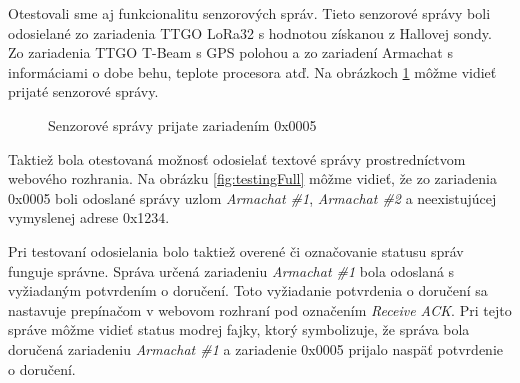 \documentclass[slovak,master]{diploma}
\begin{document}
Otestovali sme aj funkcionalitu senzorových správ. Tieto senzorové správy boli odosielané zo zariadenia TTGO LoRa32 s hodnotou získanou z Hallovej sondy. 
Zo zariadenia TTGO T-Beam s GPS polohou a zo zariadení Armachat s informáciami o dobe behu, teplote procesora atď. 
Na obrázkoch \ref{fig:testingSensors} môžme vidieť prijaté senzorové správy.
\begin{figure}[h!]
  \centering
  \caption{Senzorové správy prijate zariadením 0x0005}
  \label{fig:testingSensors}
\end{figure}

Taktiež bola otestovaná možnosť odosielať textové správy prostredníctvom webového rozhrania. Na obrázku \ref{fig:testingFull} môžme vidieť, 
že zo zariadenia 0x0005 boli odoslané správy uzlom \emph{Armachat \#1}, \emph{Armachat \#2} a neexistujúcej vymyslenej adrese 0x1234. 

Pri testovaní odosielania bolo taktiež overené či označovanie statusu správ funguje správne. Správa určená zariadeniu \emph{Armachat \#1} bola 
odoslaná s vyžiadaným potvrdením o doručení. Toto vyžiadanie potvrdenia o doručení sa nastavuje prepínačom v webovom rozhraní pod označením \emph{Receive ACK}.
Pri tejto správe môžme vidieť status modrej fajky, ktorý symbolizuje, že správa bola doručená zariadeniu \emph{Armachat \#1} a zariadenie 0x0005 
prijalo naspäť potvrdenie o doručení. 
\end{document}

